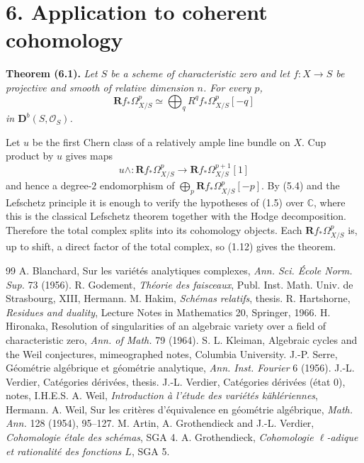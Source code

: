 \documentclass[11pt]{article}
\newcommand{\bD}{\mathbf D}
\newcommand{\cO}{\mathcal O}
\newcommand{\bR}{\mathbf R}
\newcommand{\C}{\mathbb C}
\newenvironment{named}[1]{\par\medskip\noindent\textbf{#1}\itshape}{\par\medskip}
\begin{document}
\section*{6. Application to coherent cohomology}
\begin{named}{Theorem (6.1).}
Let $S$ be a scheme of characteristic zero and let $f:X\to S$ be projective and smooth of relative dimension $n$. For every $p$,
\[
\bR f_*\Omega^p_{X/S}\simeq\bigoplus_qR^qf_*\Omega^p_{X/S}[-q]
\]
in $\bD^b(S,\cO_S)$.
\end{named}
Let $u$ be the first Chern class of a relatively ample line bundle on $X$. Cup product by $u$ gives maps
\[
u\wedge:\bR f_*\Omega^p_{X/S}\longrightarrow\bR f_*\Omega^{p+1}_{X/S}[1]
\]
and hence a degree-$2$ endomorphism of $\bigoplus_p\bR f_*\Omega^p_{X/S}[-p]$. By (5.4) and the Lefschetz principle it is enough to verify the hypotheses of (1.5) over $\C$, where this is the classical Lefschetz theorem together with the Hodge decomposition. Therefore the total complex splits into its cohomology objects. Each $\bR f_*\Omega^p_{X/S}$ is, up to shift, a direct factor of the total complex, so (1.12) gives the theorem.

\begin{thebibliography}{99}
 A. Blanchard, Sur les variétés analytiques complexes, \emph{Ann. Sci. École Norm. Sup.} 73 (1956).
 R. Godement, \emph{Théorie des faisceaux}, Publ. Inst. Math. Univ. de Strasbourg, XIII, Hermann.
 M. Hakim, \emph{Schémas relatifs}, thesis.
 R. Hartshorne, \emph{Residues and duality}, Lecture Notes in Mathematics 20, Springer, 1966.
 H. Hironaka, Resolution of singularities of an algebraic variety over a field of characteristic zero, \emph{Ann. of Math.} 79 (1964).
 S. L. Kleiman, Algebraic cycles and the Weil conjectures, mimeographed notes, Columbia University.
 J.-P. Serre, Géométrie algébrique et géométrie analytique, \emph{Ann. Inst. Fourier} 6 (1956).
 J.-L. Verdier, Catégories dérivées, thesis.
 J.-L. Verdier, Catégories dérivées (état 0), notes, I.H.E.S.
 A. Weil, \emph{Introduction à l'étude des variétés kählériennes}, Hermann.
 A. Weil, Sur les critères d'équivalence en géométrie algébrique, \emph{Math. Ann.} 128 (1954), 95--127.
 M. Artin, A. Grothendieck and J.-L. Verdier, \emph{Cohomologie étale des schémas}, SGA 4.
 A. Grothendieck, \emph{Cohomologie $\ell$-adique et rationalité des fonctions $L$}, SGA 5.
\end{thebibliography}
\end{document}

